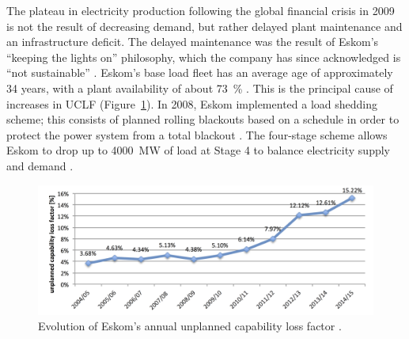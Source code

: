 The plateau in electricity production following the global financial crisis in 2009 is not the result of decreasing demand, but rather delayed plant maintenance and an infrastructure deficit. The delayed maintenance was the result of Eskom's \enquote{keeping the lights on} philosophy, which the company has since acknowledged is \enquote{not sustainable} \cite{Eskom2014}. Eskom's base load fleet has an average age of approximately 34 years, with a plant availability of about \SI{73}{\percent} \cite{Eskom2015c}. This is the principal cause of increases in \ac{UCLF} (Figure~\ref{UCLF}). In 2008, Eskom implemented a load shedding scheme; this consists of planned rolling blackouts based on a schedule in order to protect the power system from a total blackout \cite{Eskom2015d}. The four-stage scheme allows Eskom to drop up to \SI{4000}{\mega\watt} of load at Stage 4 to balance electricity supply and demand \cite{Eskom2015e}.

\begin{figure}[htbp]  
\centering
\includegraphics[width=1\linewidth]{FIG/UCLF}
\caption[Evolution of Eskom's annual unplanned capability loss factor.]{Evolution of Eskom's annual unplanned capability loss factor \cite{Eskom2015b,Eskom2015d}.}\label{UCLF}
\end{figure}

